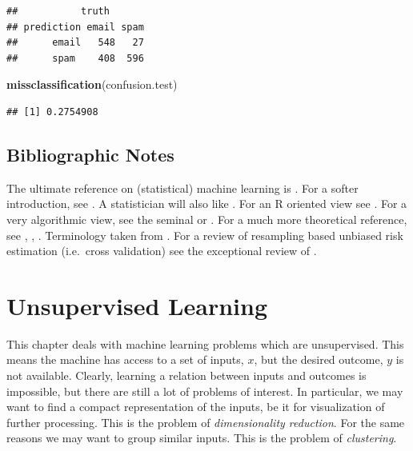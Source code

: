\documentclass[]{book}
\newenvironment{Shaded}{\begin{snugshade}}{\end{snugshade}}
\newcommand{\KeywordTok}[1]{\textcolor[rgb]{0.13,0.29,0.53}{\textbf{{#1}}}}
\newcommand{\NormalTok}[1]{{#1}}
\theoremstyle{definition}
\theoremstyle{definition}
\theoremstyle{remark}
\begin{document}
\begin{verbatim}
##           truth
## prediction email spam
##      email   548   27
##      spam    408  596
\end{verbatim}

\begin{Shaded}
\begin{Highlighting}[]
\KeywordTok{missclassification}\NormalTok{(confusion.test)}
\end{Highlighting}
\end{Shaded}

\begin{verbatim}
## [1] 0.2754908
\end{verbatim}

\section{Bibliographic Notes}\label{bibliographic-notes-6}

The ultimate reference on (statistical) machine learning is
\citet{friedman2001elements}. For a softer introduction, see
\citet{james2013introduction}. A statistician will also like
\citet{ripley2007pattern}. For an R oriented view see
\citet{lantz2013machine}. For a very algorithmic view, see the seminal
\citet{leskovec2014mining} or \citet{conway2012machine}. For a much more
theoretical reference, see \citet{mohri2012foundations},
\citet{vapnik2013nature}, \citet{shalev2014understanding}. Terminology
taken from \citet{sammut2011encyclopedia}. For a review of resampling
based unbiased risk estimation (i.e.~cross validation) see the
exceptional review of \citet{arlot2010survey}.

\chapter{Unsupervised Learning}\label{unsupervised}

This chapter deals with machine learning problems which are
unsupervised. This means the machine has access to a set of inputs,
\(x\), but the desired outcome, \(y\) is not available. Clearly,
learning a relation between inputs and outcomes is impossible, but there
are still a lot of problems of interest. In particular, we may want to
find a compact representation of the inputs, be it for visualization of
further processing. This is the problem of \emph{dimensionality
reduction}. For the same reasons we may want to group similar inputs.
This is the problem of \emph{clustering}.
\end{document}
